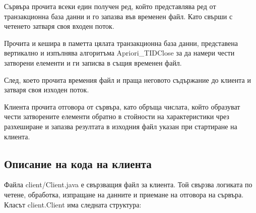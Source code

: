 \documentclass[a4paper, 12pt]{article}
\begin{document}
Сървъра прочита всеки един получен ред, който представлява ред от транзакционна база данни и го запазва във временен файл.
Като свърши с четенето затваря своя входен поток.

Прочита и кешира в паметта цялата транзакционна база данни,
представена вертикално и изпълнява алгоритъма Apriori\_TIDClose за да намери чести затворени елементи
и ги записва в същия временен файл.

След, което прочита времения файл и праща неговото съдържание до клиента и затваря своя изходен поток.

Клиента прочита отговора от сървъра, като обръща числата,
който образуват чести затворените елементи обратно в стойности на характеристики чрез разхеширане и запазва резултата в изходния файл указан при стартиране на клиента.

\subsection{Описание на кода на клиента}
Файла client/Client.java е свързващия файл за клиента.
Той свързва логиката по четене, обработка,
изпращане на данните и приемане на отговора на сървъра.
Класът client.Client има следната структура:
\end{document}
